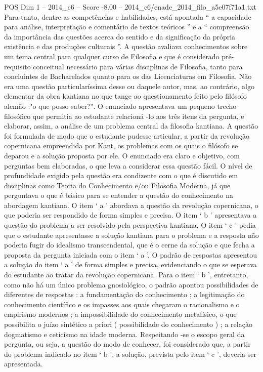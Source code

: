 \begin{textsample}{POS Dim 1 – 2014\_c6 – Score -8.00 – 2014\_c6/enade\_2014\_filo\_a5e07f71a1.txt}
Para tanto, dentre as competências e habilidades, está apontada “ a capacidade para análise, interpretação e comentário de textos teóricos ” e a “ compreensão da importância das questões acerca do sentido e da significação da própria existência e das produções culturais ”.
A questão avaliava conhecimentos sobre um tema central para qualquer curso de Filosofia e que é considerado pré-requisito conceitual necessário para várias disciplinas de Filosofia, tanto para concluintes de Bacharelados quanto para os das Licenciaturas em Filosofia.
Não era uma questão particularíssima desse ou daquele autor, mas, ao contrário, algo elementar da obra kantiana no que tange ao questionamento feito pelo filósofo alemão :"o que posso saber?".
O enunciado apresentava um pequeno trecho filosófico que permitia ao estudante relacioná -lo aos três itens da pergunta, e elaborar, assim, a análise de um problema central da filosofia kantiana.
A questão foi formulada de modo que o estudante pudesse articular, a partir da revolução copernicana empreendida por Kant, os problemas com os quais o filósofo se deparou e a solução proposta por ele.
O enunciado era claro e objetivo, com perguntas bem elaboradas, o que leva a considerar essa questão fácil.
O nível de profundidade exigido pela questão era condizente com o que é discutido em disciplinas como Teoria do Conhecimento e/ou Filosofia Moderna, já que perguntava o que é básico para se entender a questão do conhecimento na abordagem kantiana.
O item ‘ a ’ abordava a questão da revolução copernicana, o que poderia ser respondido de forma simples e precisa.
O item ‘ b ’ apresentava a questão do problema a ser resolvido pela perspectiva kantiana.
O item ‘ c ’ pedia que o estudante apresentasse a solução kantiana para o problema e a resposta não poderia fugir do idealismo transcendental, que é o cerne da solução e que fecha a proposta da pergunta iniciada com o item ‘ a ’.
O padrão de respostas apresentou a solução do item ‘ a ’ de forma simples e precisa, evidenciando o que se esperava do estudante ao tratar da revolução copernicana.
Para o item ‘ b ’, entretanto, como não há um único problema gnosiológico, o padrão apontou possibilidades de diferentes de respostas : a fundamentação do conhecimento ; a legitimação do conhecimento científico e os impasses aos quais chegaram o racionalismo e o empirismo modernos ; a impossibilidade do conhecimento metafísico, o que possibilita o juízo sintético a priori ( possibilidade do conhecimento ) ; a relação dogmatismo e ceticismo na idade moderna.
Respeitando -se o escopo geral da pergunta, ou seja, a questão do modo de conhecer, foi considerado que, a partir do problema indicado no item ‘ b ’, a solução, prevista pelo item ‘ c ’, deveria ser apresentada.

\end{textsample}
